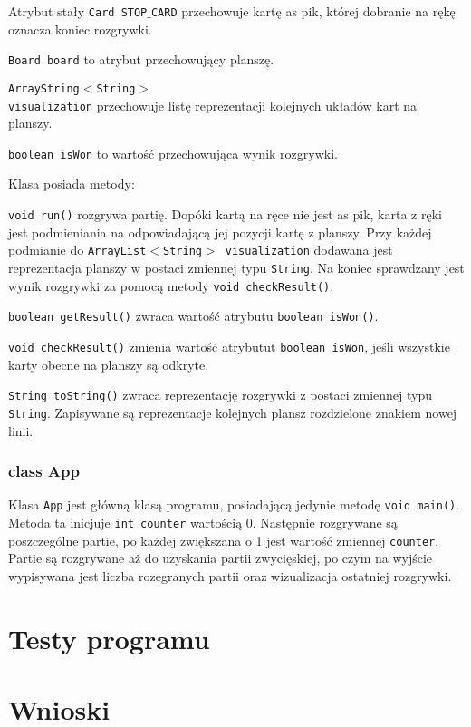 \documentclass{article}
\begin{document}
Atrybut stały \texttt{Card STOP$\_$CARD} przechowuje kartę as pik, której dobranie na rękę oznacza koniec rozgrywki.

\texttt{Board board} to atrybut przechowujący planszę.

\texttt{ArrayString$<$String$>$\\visualization} przechowuje listę reprezentacji kolejnych układów kart na planszy.

\texttt{boolean isWon} to wartość przechowująca wynik rozgrywki.

Klasa posiada metody:

\texttt{void run()} rozgrywa partię. Dopóki kartą na ręce nie jest as pik, karta z ręki jest podmieniania na odpowiadającą jej pozycji kartę z planszy. Przy każdej podmianie do \texttt{ArrayList$<$String$>$ visualization} dodawana jest reprezentacja planszy w postaci zmiennej typu \texttt{String}. Na koniec sprawdzany jest wynik rozgrywki za pomocą metody \texttt{void checkResult()}.

\texttt{boolean getResult()} zwraca wartość atrybutu \texttt{boolean isWon()}.

\texttt{void checkResult()} zmienia wartość atrybutut \texttt{boolean isWon}, jeśli wszystkie karty obecne na planszy są odkryte.

\texttt{String toString()} zwraca reprezentację rozgrywki z postaci zmiennej typu \texttt{String}. Zapisywane są reprezentacje kolejnych plansz rozdzielone znakiem nowej linii.

\subsubsection*{class App}

Klasa \texttt{App} jest główną klasą programu, posiadającą jedynie metodę \texttt{void main()}. Metoda ta inicjuje \texttt{int counter} wartością 0. Następnie rozgrywane są poszczególne partie, po każdej zwiększana o 1 jest wartość zmiennej \texttt{counter}. Partie są rozgrywane aż do uzyskania partii zwycięskiej, po czym na wyjście wypisywana jest liczba rozegranych partii oraz wizualizacja ostatniej rozgrywki.

\section{Testy programu}
\section{Wnioski}



\end{document}
